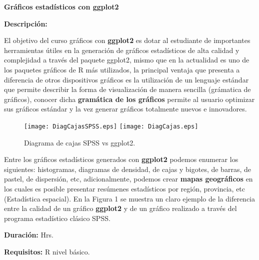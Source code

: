 \documentclass[12pt,a4paper,oneside]{article}\usepackage[]{graphicx}\usepackage[]{color}
\begin{document}

\newpage

\begin{center}
{\bf \Large Gráficos estadísticos con ggplot2}
\end{center}

{\bf \large Descripción:}\newline

El objetivo del curso gráficos con {\bf ggplot2} es dotar al estudiante de importantes herramientas útiles en la generación de gráficos estadísticos de alta calidad y complejidad a través del paquete ggplot2, mismo que en la actualidad es uno de los paquetes gráficos de R más utilizados, la principal ventaja que presenta a diferencia de otros dispositivos gráficos es la utilización de un lenguaje estándar que permite describir la forma de visualización de manera sencilla (grámatica de gráficos), conocer dicha {\bf gramática de los gráficos} permite al usuario optimizar sus gráficos estándar y la vez generar gráficos totalmente nuevos e innovadores.

\begin{figure}[H]
\begin{center}
    \texttt{[image: DiagCajasSPSS.eps]}
    \texttt{[image: DiagCajas.eps]}
  \caption{Diagrama de cajas SPSS vs ggplot2.}
  \label{spssyg2}
\end{center}
\end{figure}

Entre los gráficos estadísticos generados con {\bf ggplot2} podemos enumerar los siguientes: histogramas, diagramas de densidad, de cajas y bigotes, de barras, de pastel, de dispersión, etc, adicionalmente, podemos crear {\bf mapas geográficos} en los cuales es posible presentar resúmenes estadísticos por región, provincia, etc (Estadística espacial). En la Figura 1 se muestra un claro ejemplo de la diferencia entre la calidad de un gráfico {\bf ggplot2} y de un gráfico realizado a través del programa estadístico clásico SPSS.\newline

{\bf \large Duración:} Hrs.
  
{\bf \large Requisitos:}\newline
  R nivel básico.
  
\end{document}
